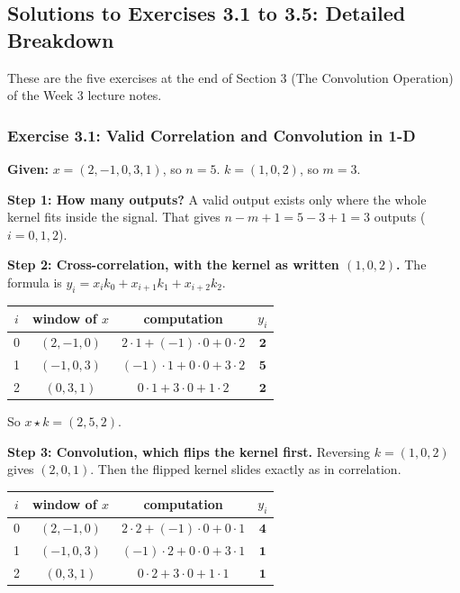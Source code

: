 \subsection*{Solutions to Exercises 3.1 to 3.5: Detailed Breakdown}

These are the five exercises at the end of Section 3 (The Convolution Operation) of the Week 3 lecture notes.

\subsubsection*{Exercise 3.1: Valid Correlation and Convolution in 1-D}

\textbf{Given:} $x = (2, -1, 0, 3, 1)$, so $n = 5$. $k = (1, 0, 2)$, so $m = 3$.

\textbf{Step 1: How many outputs?}
A valid output exists only where the whole kernel fits inside the signal. That gives $n - m + 1 = 5 - 3 + 1 = 3$ outputs ($i = 0, 1, 2$).

\textbf{Step 2: Cross-correlation, with the kernel as written $(1, 0, 2)$.}
The formula is $y_i = x_i k_0 + x_{i+1} k_1 + x_{i+2} k_2$.

\begin{center}
\begin{tabular}{cccc}
\toprule
$i$ & window of $x$ & computation & $y_i$ \\
\midrule
0 & $(2, -1, 0)$ & $2\cdot 1 + (-1)\cdot 0 + 0\cdot 2$ & $\mathbf{2}$ \\
1 & $(-1, 0, 3)$ & $(-1)\cdot 1 + 0\cdot 0 + 3\cdot 2$ & $\mathbf{5}$ \\
2 & $(0, 3, 1)$ & $0\cdot 1 + 3\cdot 0 + 1\cdot 2$ & $\mathbf{2}$ \\
\bottomrule
\end{tabular}
\end{center}

So $x \star k = (2, 5, 2)$.

\textbf{Step 3: Convolution, which flips the kernel first.}
Reversing $k = (1, 0, 2)$ gives $(2, 0, 1)$. Then the flipped kernel slides exactly as in correlation.

\begin{center}
\begin{tabular}{cccc}
\toprule
$i$ & window of $x$ & computation & $y_i$ \\
\midrule
0 & $(2, -1, 0)$ & $2\cdot 2 + (-1)\cdot 0 + 0\cdot 1$ & $\mathbf{4}$ \\
1 & $(-1, 0, 3)$ & $(-1)\cdot 2 + 0\cdot 0 + 3\cdot 1$ & $\mathbf{1}$ \\
2 & $(0, 3, 1)$ & $0\cdot 2 + 3\cdot 0 + 1\cdot 1$ & $\mathbf{1}$ \\
\bottomrule
\end{tabular}
\end{center}

